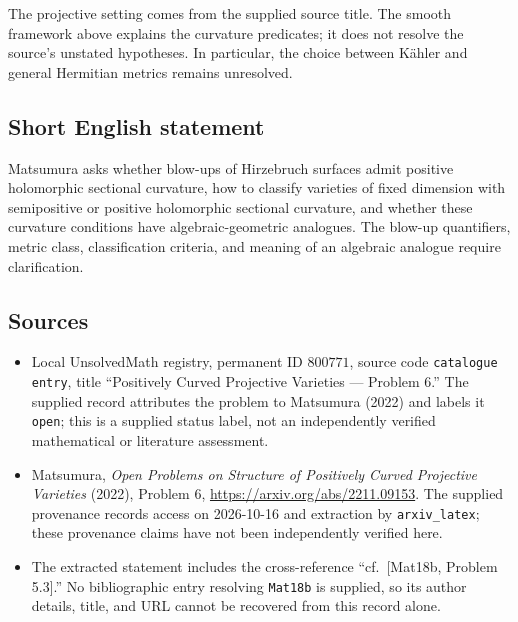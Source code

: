 \documentclass[11pt]{article}
\begin{document}
The projective setting comes from the supplied source title. The smooth framework above explains the curvature predicates; it does not resolve the source's unstated hypotheses. In particular, the choice between K\"ahler and general Hermitian metrics remains unresolved.
\subsection{Short English statement}
Matsumura asks whether blow-ups of Hirzebruch surfaces admit positive holomorphic sectional curvature, how to classify varieties of fixed dimension with semipositive or positive holomorphic sectional curvature, and whether these curvature conditions have algebraic-geometric analogues. The blow-up quantifiers, metric class, classification criteria, and meaning of an algebraic analogue require clarification.
\subsection{Sources}
\begin{itemize}
\item Local UnsolvedMath registry, permanent ID \(800771\), source code \texttt{catalogue entry}, title ``Positively Curved Projective Varieties --- Problem 6.'' The supplied record attributes the problem to Matsumura (2022) and labels it \texttt{open}; this is a supplied status label, not an independently verified mathematical or literature assessment.
\item Matsumura, \emph{Open Problems on Structure of Positively Curved Projective Varieties} (2022), Problem 6, \url{https://arxiv.org/abs/2211.09153}. The supplied provenance records access on 2026-10-16 and extraction by \texttt{arxiv\_latex}; these provenance claims have not been independently verified here.
\item The extracted statement includes the cross-reference ``cf.\ [Mat18b, Problem 5.3].'' No bibliographic entry resolving \texttt{Mat18b} is supplied, so its author details, title, and URL cannot be recovered from this record alone.
\end{itemize}
\end{document}
